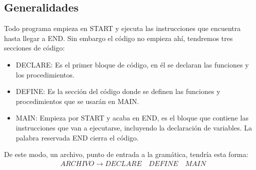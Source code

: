 \documentclass[a4paper, 12pt]{article}
\begin{document}
\subsection{Generalidades}
Todo programa empieza en START y ejecuta las instrucciones que encuentra hasta llegar a END. Sin embargo el código no empieza ahí, tendremos tres secciones de código:
\begin{itemize}
\item DECLARE: Es el primer bloque de código, en él se declaran las funciones y los procedimientos.
\item DEFINE: Es la sección del código donde se definen las funciones y procedimientos que se usarán en MAIN.
\item MAIN: Empieza por START y acaba en END, es el bloque que contiene las instrucciones que van a ejecutarse, incluyendo la declaración de variables. La palabra reservada END cierra el código.
\end{itemize}
De este modo, un archivo, punto de entrada a la gramática, tendría esta forma:
\begin{align*}
&ARCHIVO \rightarrow DECLARE\quad DEFINE\quad MAIN
\end{align*}
\end{document}
